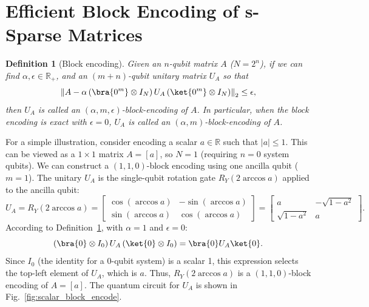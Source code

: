 \documentclass{article}
\newtheorem{definition}{Definition}[section]
\begin{document}
    \section{Efficient Block Encoding of s-Sparse Matrices}
    \begin{definition}[Block encoding]
        \label{def:block_encoding}
        Given an $n$-qubit matrix $A$ ($N = 2^n$), if we can find $\alpha, \epsilon \in \mathbb{R}_+$, and an $(m + n)$-qubit unitary matrix $U_A$ so that
        \begin{equation}
            \left\| A - \alpha \left( \bra{0^m} \otimes I_N \right) U_A \left( \ket{0^m} \otimes I_N \right) \right\|_2 \leq \epsilon,\label{eq:equation2}
        \end{equation}
        then $U_A$ is called an $(\alpha, m, \epsilon)$-block-encoding of $A$. In particular, when the block encoding is exact with $\epsilon = 0$, $U_A$ is called an $(\alpha, m)$-block-encoding of $A$.
    \end{definition}

    For a simple illustration, consider encoding a scalar $a \in \mathbb{R}$ such that $|a| \leq 1$. This can be viewed as a $1 \times 1$ matrix $A=[a]$, so $N=1$ (requiring $n=0$ system qubits). We can construct a $(1, 1, 0)$-block encoding using one ancilla qubit ($m=1$). The unitary $U_A$ is the single-qubit rotation gate $R_Y(2 \arccos a)$ applied to the ancilla qubit:
    \begin{equation}
        U_A = R_Y(2 \arccos a) = \begin{bmatrix}
                                     \cos(\arccos a) & -\sin(\arccos a) \\ \sin(\arccos a) & \cos(\arccos a)
        \end{bmatrix} = \begin{bmatrix}
                            a & -\sqrt{1-a^2} \\ \sqrt{1-a^2} & a
        \end{bmatrix}.\label{eq:equation3}
    \end{equation}
    According to Definition~\ref{def:block_encoding}, with $\alpha=1$ and $\epsilon=0$:
    $$ \left( \bra{0} \otimes I_0 \right) U_A \left( \ket{0} \otimes I_0 \right) = \bra{0} U_A \ket{0}. $$
    Since $I_0$ (the identity for a 0-qubit system) is a scalar 1, this expression selects the top-left element of $U_A$, which is $a$. Thus, $R_Y(2 \arccos a)$ is a $(1,1,0)$-block encoding of $A=[a]$. The quantum circuit for $U_A$ is shown in Fig.~\ref{fig:scalar_block_encode}.
\end{document}
